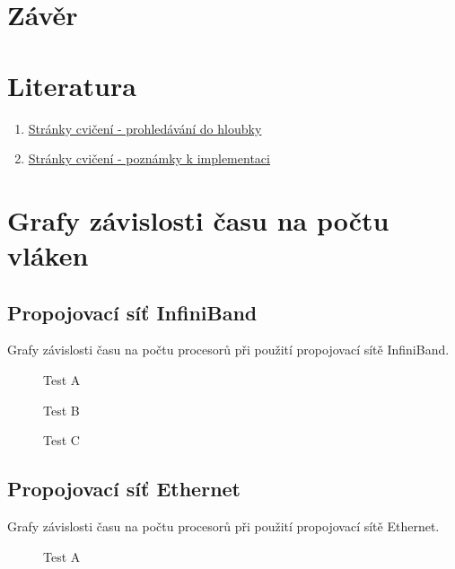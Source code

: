 \documentclass[12pt]{article}
\begin{document}
\section{Závěr}

\section{Literatura}
\begin{enumerate}
\item \href{https://edux.fit.cvut.cz/courses/MI-PAR/labs/prohledavani_do_hloubky}{Stránky cvičení - prohledávání do hloubky}
\item \href{https://edux.fit.cvut.cz/courses/MI-PAR/labs/poznamky_k_implementaci}{Stránky cvičení - poznámky k implementaci}
\end{enumerate}


\appendix
\section{Grafy závislosti času na počtu vláken}
\subsection{Propojovací síť InfiniBand}
Grafy závislosti času na počtu procesorů při použití propojovací sítě InfiniBand.
\begin{figure}[H]
\begin{center}
\caption{Test A}
\label{fig:testAinfib}
\end{center}
\end{figure}

\begin{figure}[H]
\begin{center}
\caption{Test B}
\label{fig:testBinfib}
\end{center}
\end{figure}

\begin{figure}[H]
\begin{center}
\caption{Test C}
\label{fig:testCinfib}
\end{center}
\end{figure}

\subsection{Propojovací síť Ethernet}
Grafy závislosti času na počtu procesorů při použití propojovací sítě Ethernet.
\begin{figure}[H]
\begin{center}
\caption{Test A}
\label{fig:testAether}
\end{center}
\end{figure}
\end{document}
